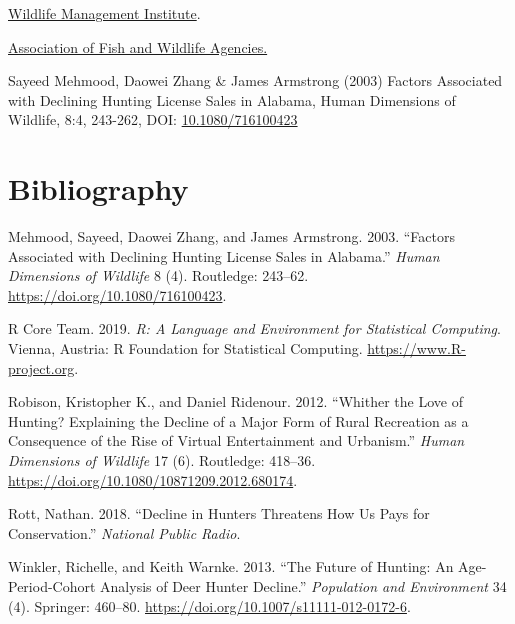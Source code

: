 \documentclass[]{tufte-handout}
\begin{document}
\href{https://wildlifemanagement.institute}{Wildlife Management
Institute}.

\href{https://www.fishwildlife.org}{Association of Fish and Wildlife
Agencies.}

Sayeed Mehmood, Daowei Zhang \& James Armstrong (2003) Factors
Associated with Declining Hunting License Sales in Alabama, Human
Dimensions of Wildlife, 8:4, 243-262, DOI:
\href{https://www.tandfonline.com/doi/abs/10.1080/716100423}{10.1080/716100423}

\hypertarget{bibliography}{%
\section*{Bibliography}\label{bibliography}}

\hypertarget{refs}{}
\leavevmode\hypertarget{ref-Mehmood}{}%
Mehmood, Sayeed, Daowei Zhang, and James Armstrong. 2003. ``Factors
Associated with Declining Hunting License Sales in Alabama.''
\emph{Human Dimensions of Wildlife} 8 (4). Routledge: 243--62.
\url{https://doi.org/10.1080/716100423}.

\leavevmode\hypertarget{ref-R-base}{}%
R Core Team. 2019. \emph{R: A Language and Environment for Statistical
Computing}. Vienna, Austria: R Foundation for Statistical Computing.
\url{https://www.R-project.org}.

\leavevmode\hypertarget{ref-Robison}{}%
Robison, Kristopher K., and Daniel Ridenour. 2012. ``Whither the Love of
Hunting? Explaining the Decline of a Major Form of Rural Recreation as a
Consequence of the Rise of Virtual Entertainment and Urbanism.''
\emph{Human Dimensions of Wildlife} 17 (6). Routledge: 418--36.
\url{https://doi.org/10.1080/10871209.2012.680174}.

\leavevmode\hypertarget{ref-rott}{}%
Rott, Nathan. 2018. ``Decline in Hunters Threatens How Us Pays for
Conservation.'' \emph{National Public Radio}.

\leavevmode\hypertarget{ref-winkler}{}%
Winkler, Richelle, and Keith Warnke. 2013. ``The Future of Hunting: An
Age-Period-Cohort Analysis of Deer Hunter Decline.'' \emph{Population
and Environment} 34 (4). Springer: 460--80.
\url{https://doi.org/10.1007/s11111-012-0172-6}.
\end{document}
